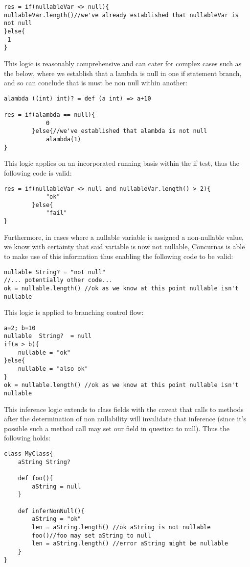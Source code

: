 \documentclass[conc-doc]{subfiles}
\begin{document}
\begin{lstlisting}
res = if(nullableVar <> null){
nullableVar.length()//we've already established that nullableVar is not null
}else{
-1
}
\end{lstlisting}

This logic is reasonably comprehensive and can cater for complex cases such as the below, where we establish that a lambda is null in one if statement branch, and so can conclude that is must be non null within another:

\begin{lstlisting}
alambda ((int) int)? = def (a int) => a+10

res = if(alambda == null){
			0
		}else{//we've established that alambda is not null
			alambda(1)
}
\end{lstlisting}

This logic applies on an incorporated running basis within the if test, thus the following code is valid:

\begin{lstlisting}
res = if(nullableVar <> null and nullableVar.length() > 2){
			"ok"
		}else{
			"fail"
}
\end{lstlisting}


Furthermore, in cases where a nullable variable is assigned a non-nullable value, we know with certainty that said variable is now not nullable, Concurnas is able to make use of this information thus enabling the following code to be valid:

\begin{lstlisting}
nullable String? = "not null"
//... potentially other code...
ok = nullable.length() //ok as we know at this point nullable isn't nullable
\end{lstlisting}

This logic is applied to branching control flow:

\begin{lstlisting}
a=2; b=10
nullable  String?  = null
if(a > b){
	nullable = "ok"
}else{
	nullable = "also ok"
}
ok = nullable.length() //ok as we know at this point nullable isn't nullable
\end{lstlisting}

This inference logic extends to class fields with the caveat that calls to methods after the determination of non nullability will invalidate that inference (since it's possible such a method call may set our field in question to null). Thus the following holds:

\begin{lstlisting}
class MyClass{
	aString String?

	def foo(){ 
		aString = null
	}
	
	def inferNonNull(){
		aString = "ok"
		len = aString.length() //ok aString is not nullable
		foo()//foo may set aString to null
		len = aString.length() //error aString might be nullable
	}
}
\end{lstlisting}
\end{document}
